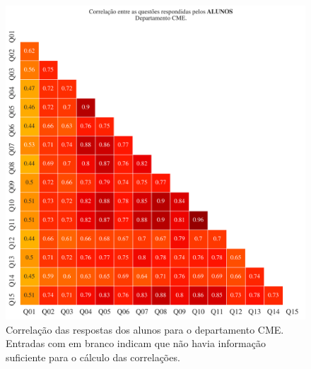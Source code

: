 \documentclass[a4paper,10pt]{article}
\begin{document}
\begin{figure}[h]
\centering
\includegraphics[width=0.999\linewidth]{matriz_corr__CME_alunos.png}
\caption{\label{fig:corr_alunos}Correlação das respostas dos alunos para o departamento CME. Entradas com em branco indicam que não havia informação suficiente para o cálculo das correlações.}
\end{figure}
\end{document}
